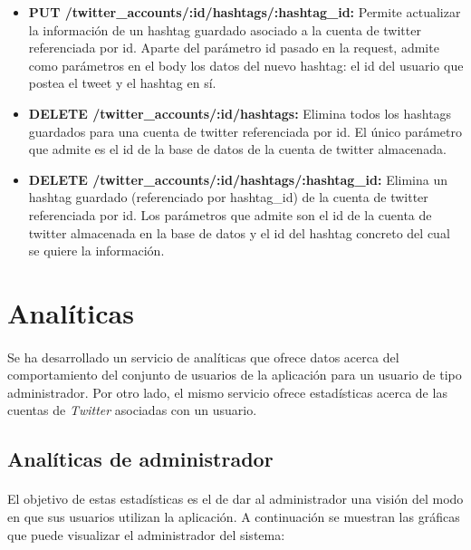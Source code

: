 \documentclass[a4paper]{article}
\begin{document}
\begin{itemize}
		\item \textbf{PUT /twitter\_accounts/:id/hashtags/:hashtag\_id:} Permite actualizar la información de un hashtag guardado asociado a la cuenta de twitter referenciada por id. Aparte del parámetro id pasado en la request, admite como parámetros en el body los datos del nuevo hashtag: el id del usuario que postea el tweet y el hashtag en sí.
		
		\item \textbf{DELETE /twitter\_accounts/:id/hashtags:} Elimina todos los hashtags guardados para una cuenta de twitter referenciada por id. El único parámetro que admite es el id de la base de datos de la cuenta de twitter almacenada.
		
		\item \textbf{DELETE /twitter\_accounts/:id/hashtags/:hashtag\_id:} Elimina un hashtag guardado (referenciado por hashtag\_id) de la cuenta de twitter referenciada por id. Los parámetros que admite son el id de la cuenta de twitter almacenada en la base de datos y el id del hashtag concreto del cual se quiere la información.
	\end{itemize}
	\newpage
\section{Analíticas}

	\paragraph{} Se ha desarrollado un servicio de analíticas que ofrece datos acerca del comportamiento del conjunto de usuarios de la aplicación para un usuario de tipo administrador. Por otro lado, el mismo servicio ofrece estadísticas acerca de las cuentas de \textit{Twitter} asociadas con un usuario.
	
	\subsection{Analíticas de administrador}
	
		\paragraph{} El objetivo de estas estadísticas es el de dar al administrador una visión del modo en que sus usuarios utilizan la aplicación. A continuación se muestran las gráficas que puede visualizar el administrador del sistema:
		
\end{document}
